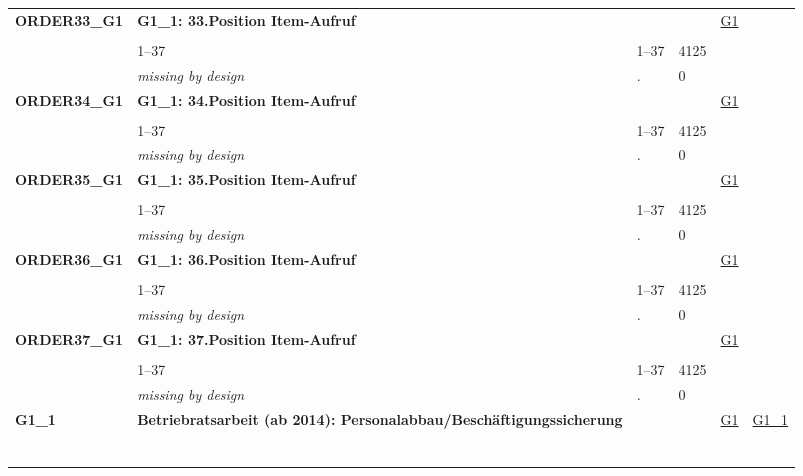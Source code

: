 \begin{longtable}{| L{2.45cm} | L{6cm} | C{1.5cm} | R{1cm} | C{2.25cm} | C{2.25cm} |}
   \midrule
\textbf{ORDER33\_G1}\label{var:ORDER33:G1} & \textbf{G1\_1: 33.Position Item-Aufruf} &  &  & \hyperref[G1]{G1} & \hyperref[var:suf:]{} \\ 
   &  &  &  &  &  \\ 
   & 1--37 & 1--37 & 4125 &  &  \\ 
   & \textit{missing by design} & \textit{.} & 0 &  &  \\ 
   \midrule
\textbf{ORDER34\_G1}\label{var:ORDER34:G1} & \textbf{G1\_1: 34.Position Item-Aufruf} &  &  & \hyperref[G1]{G1} & \hyperref[var:suf:]{} \\ 
   &  &  &  &  &  \\ 
   & 1--37 & 1--37 & 4125 &  &  \\ 
   & \textit{missing by design} & \textit{.} & 0 &  &  \\ 
   \midrule
\textbf{ORDER35\_G1}\label{var:ORDER35:G1} & \textbf{G1\_1: 35.Position Item-Aufruf} &  &  & \hyperref[G1]{G1} & \hyperref[var:suf:]{} \\ 
   &  &  &  &  &  \\ 
   & 1--37 & 1--37 & 4125 &  &  \\ 
   & \textit{missing by design} & \textit{.} & 0 &  &  \\ 
   \midrule
\textbf{ORDER36\_G1}\label{var:ORDER36:G1} & \textbf{G1\_1: 36.Position Item-Aufruf} &  &  & \hyperref[G1]{G1} & \hyperref[var:suf:]{} \\ 
   &  &  &  &  &  \\ 
   & 1--37 & 1--37 & 4125 &  &  \\ 
   & \textit{missing by design} & \textit{.} & 0 &  &  \\ 
   \midrule
\textbf{ORDER37\_G1}\label{var:ORDER37:G1} & \textbf{G1\_1: 37.Position Item-Aufruf} &  &  & \hyperref[G1]{G1} & \hyperref[var:suf:]{} \\ 
   &  &  &  &  &  \\ 
   & 1--37 & 1--37 & 4125 &  &  \\ 
   & \textit{missing by design} & \textit{.} & 0 &  &  \\ 
   \midrule
\textbf{G1\_1}\label{var:G1:1} & \textbf{Betriebratsarbeit (ab 2014): Personalabbau/Beschäftigungssicherung} &  &  & \hyperref[G1]{G1} & \hyperref[var:suf:G1:1]{G1\_1} \\ 
   & \protect\subsection[Variablen G1\_1 bis G1\_37]{} &  &  &  &  \\ 

\end{longtable}
